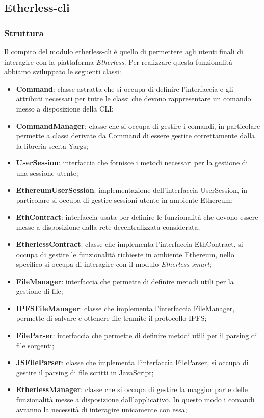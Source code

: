 \subsection{Etherless-cli}
\subsubsection{Struttura}
Il compito del modulo etherless-cli è quello di permettere agli utenti finali di interagire con la piattaforma \textit{Etherless}. Per realizzare questa funzionalità abbiamo sviluppato le seguenti classi:
\begin{itemize}
	\item \textbf{Command}: classe astratta che si occupa di definire l'interfaccia e gli attributi necessari per tutte le classi che devono rappresentare un comando messo a disposizione della CLI;
	\item \textbf{CommandManager}: classe che si occupa di gestire i comandi, in particolare permette a classi derivate da Command di essere gestite correttamente dalla la libreria scelta Yargs;
	\item \textbf{UserSession}: interfaccia che fornisce i metodi necessari per la gestione di una sessione utente; 
	\item \textbf{EthereumUserSession}: implementazione dell'interfaccia UserSession, in particolare si occupa di gestire sessioni utente in ambiente Ethereum; 
	\item \textbf{EthContract}: interfaccia usata per definire le funzionalità che devono essere messe a disposizione dalla rete decentralizzata considerata; 
	\item \textbf{EtherlessContract}: classe che implementa l'interfaccia EthContract, si occupa di gestire le funzionalità richieste in ambiente Ethereum, nello specifico si occupa di interagire con il modulo \textit{Etherless-smart}; 
	\item \textbf{FileManager}: interfaccia che permette di definire metodi utili per la gestione di file; 
	\item \textbf{IPFSFileManager}: classe che implementa l'interfaccia FileManager, permette di salvare e ottenere file tramite il protocollo IPFS; 
	\item \textbf{FileParser}: interfaccia che permette di definire metodi utili per il parsing di file sorgenti; 
	\item \textbf{JSFileParser}: classe che implementa l'interfaccia FileParser, si occupa di gestire il parsing di file scritti in JavaScript; 
	\item \textbf{EtherlessManager}: classe che si occupa di gestire la maggior parte delle funzionalità messe a disposizione dall'applicativo. In questo modo i comandi avranno la necessità di interagire unicamente con essa; 
\end{itemize}

